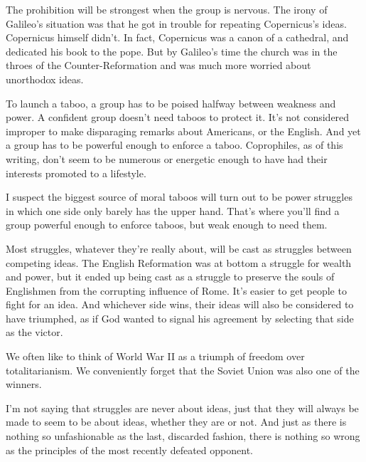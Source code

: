 The
                  prohibition will be strongest when the group is nervous. The
                  irony of Galileo's situation was that he got in trouble for
                  repeating Copernicus's ideas. Copernicus himself didn't. In
                  fact, Copernicus was a canon of a cathedral, and dedicated his
                  book to the pope. But by Galileo's time the church was in the
                  throes of the Counter-Reformation and was much more worried
                  about unorthodox ideas.

To launch a taboo, a group
                  has to be poised halfway between weakness and power. A
                  confident group doesn't need taboos to protect it. It's not
                  considered improper to make disparaging remarks about
                  Americans, or the English. And yet a group has to be powerful
                  enough to enforce a taboo. Coprophiles, as of this writing,
                  don't seem to be numerous or energetic enough to have had
                  their interests promoted to a lifestyle.

I suspect
                  the biggest source of moral taboos will turn out to be power
                  struggles in which one side only barely has the upper hand.
                  That's where you'll find a group powerful enough to enforce
                  taboos, but weak enough to need them.

Most
                  struggles, whatever they're really about, will be cast as
                  struggles between competing ideas. The English Reformation was
                  at bottom a struggle for wealth and power, but it ended up
                  being cast as a struggle to preserve the souls of Englishmen
                  from the corrupting influence of Rome. It's easier to get
                  people to fight for an idea. And whichever side wins, their
                  ideas will also be considered to have triumphed, as if God
                  wanted to signal his agreement by selecting that side as the
                  victor.

We often like to think of World War II as a
                  triumph of freedom over totalitarianism. We conveniently
                  forget that the Soviet Union was also one of the winners.

I'm
                  not saying that struggles are never about ideas, just that
                  they will always be made to seem to be about ideas, whether
                  they are or not. And just as there is nothing so unfashionable
                  as the last, discarded fashion, there is nothing so wrong as
                  the principles of the most recently defeated opponent.
                  
